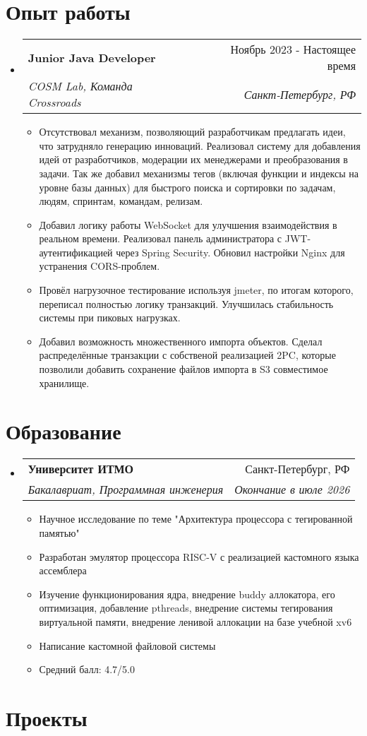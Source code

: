 \documentclass[letterpaper,11pt]{article}
\makeatletter
\newcommand{\resumeItem}[1]{
  \item\small{
    {#1 \vspace{-2pt}}
  }
}
\newcommand{\resumeSubheading}[4]{
  \vspace{-2pt}\item
    \begin{tabular*}{0.97\textwidth}[t]{l@{\extracolsep{\fill}}r}
      \textbf{#1} & #2 \\
      \textit{\small#3} & \textit{\small #4} \\
    \end{tabular*}\vspace{-7pt}
}
\newcommand{\resumeSubHeadingListStart}{\begin{itemize}[leftmargin=0.15in, label={}]}
\newcommand{\resumeSubHeadingListEnd}{\end{itemize}}
\newcommand{\resumeItemListStart}{\begin{itemize}}
\newcommand{\resumeItemListEnd}{\end{itemize}\vspace{-5pt}}
\makeatother
\begin{document}
\section{Опыт работы}
\resumeSubHeadingListStart
  \resumeSubheading
    {Junior Java Developer}{Ноябрь 2023 - Настоящее время}
    {COSM Lab, Команда Crossroads}{Санкт-Петербург, РФ}
    \resumeItemListStart
      \resumeItem{Отсутствовал механизм, позволяющий разработчикам предлагать идеи, что затрудняло генерацию инноваций. Реализовал систему для добавления идей от разработчиков, модерации их менеджерами и преобразования в задачи. Так же добавил механизмы тегов (включая функции и индексы на уровне базы данных) для быстрого поиска и сортировки по задачам, людям, спринтам, командам, релизам.}
      \resumeItem{Добавил логику работы WebSocket для улучшения взаимодействия в реальном времени. Реализовал панель администратора с JWT-аутентификацией через Spring Security. Обновил настройки Nginx для устранения CORS-проблем.}
      \resumeItem{Провёл нагрузочное тестирование используя jmeter, по итогам которого, переписал полностью логику транзакций. Улучшилась стабильность системы при пиковых нагрузках.}
      \resumeItem{Добавил возможность множественного импорта объектов. Сделал распределённые транзакции с собственой реализацией 2PC, которые позволили добавить сохранение файлов импорта в S3 совместимое хранилище.}
      \resumeItemListEnd
  \resumeSubHeadingListEnd

\section{Образование}
  \resumeSubHeadingListStart
    \resumeSubheading
      {Университет ИТМО}{Санкт-Петербург, РФ}
      {Бакалавриат, Программная инженерия}{Окончание в июле 2026}
          \resumeItemListStart
            \resumeItem{Научное исследование по теме "Архитектура процессора с тегированной памятью"}
            \resumeItem{Разработан эмулятор процессора RISC-V с реализацией кастомного языка ассемблера}
            \resumeItem{Изучение функционирования ядра, внедрение buddy аллокатора, его оптимизация, добавление pthreads, внедрение системы тегирования виртуальной памяти, внедрение ленивой аллокации на базе учебной xv6}
            \resumeItem{Написание кастомной файловой системы}
            \resumeItem{Средний балл: 4.7/5.0}
        \resumeItemListEnd
  \resumeSubHeadingListEnd


\section{Проекты}
\end{document}
